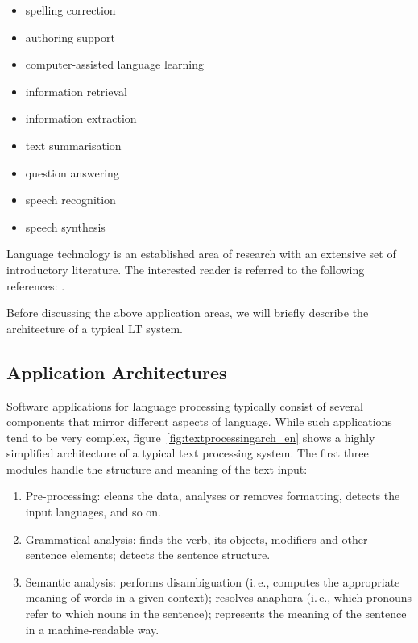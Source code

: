 \begin{multicols}{2}
\begin{itemize}
\item spelling correction
\item authoring support
\item computer-assisted language learning
\item information retrieval 
\item information extraction
\item text summarisation
\item question answering
\item speech recognition 
\item speech synthesis 
\end{itemize}

Language technology is an established area of research with an
extensive set of introductory literature. The interested reader is
referred to the following references: \cite{jurafsky-martin01,
  manning-schuetze1, lt-world1, lt-survey1}.

Before discussing the above application areas, we will briefly describe the architecture of a typical LT system.

\subsection{Application Architectures}

Software applications for language processing typically consist of
several components that mirror different aspects of language. While
such applications tend to be very complex, figure~\ref{fig:textprocessingarch_en} shows a highly simplified architecture of a typical text processing system. The first three modules handle the structure and meaning of the text input:

\begin{enumerate}
\item Pre-processing: cleans the data, analyses or removes formatting, detects the input languages, and so on.
\item Grammatical analysis: finds the verb, its objects, modifiers and
  other sentence elements; detects the sentence structure.
\item Semantic analysis: performs disambiguation (i.\,e., computes the appropriate meaning of words in a given context); resolves anaphora (i.\,e., which pronouns refer to which nouns in the sentence); represents the meaning of the sentence in a machine-readable way.
\end{enumerate}


\end{multicols}
